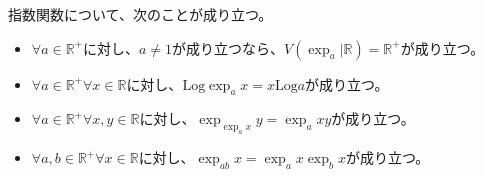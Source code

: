 \documentclass[dvipdfmx]{jsarticle}
\begin{document}
\begin{thm}\label{4.3.3.11} 指数関数について、次のことが成り立つ。
\begin{itemize}
\item
  $\forall a \in \mathbb{R}^{+}$に対し、$a \neq 1$が成り立つなら、$V\left( \exp_{a}|\mathbb{R} \right) = \mathbb{R}^{+}$が成り立つ。
\item
  $\forall a \in \mathbb{R}^{+}\forall x \in \mathbb{R}$に対し、$\mathrm{Log}{\exp_{a}x} = x\mathrm{Log}a$が成り立つ。
\item
  $\forall a \in \mathbb{R}^{+}\forall x,y \in \mathbb{R}$に対し、$\exp_{\exp_{a}x}y = \exp_{a}{xy}$が成り立つ。
\item
  $\forall a,b \in \mathbb{R}^{+}\forall x \in \mathbb{R}$に対し、$\exp_{ab}x = \exp_{a}x\exp_{b}x$が成り立つ。
\end{itemize}
\end{thm}
\end{document}
